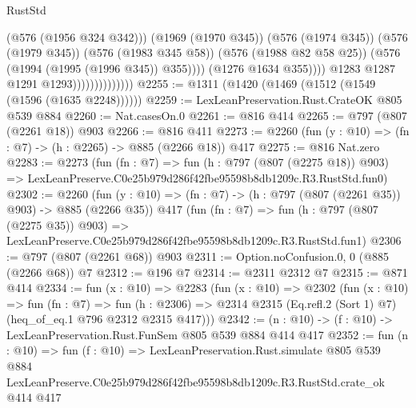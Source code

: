 \begin{lexlean}{RustStd}
\begin{coremodule}
                                            (@576 (@1956 @324 @342)))
                                          (@1969 (@1970 @345))
                                          (@576 (@1974 @345))
                                          (@576 (@1979 @345))
                                          (@576 (@1983 @345 @58))
                                          (@576 (@1988 @82 @58 @25))
                                          (@576 (@1994 (@1995 (@1996 @345)) @355))))
                                      (@1276 @1634 @355))))
                                @1283
                                @1287
                                @1291
                                @1293))))))))))))))
@2255 := @1311 (@1420 (@1469 (@1512 (@1549 (@1596 (@1635 @2248))))))
@2259 := LexLeanPreservation.Rust.CrateOK @805 @539 @884
@2260 := Nat.casesOn.{0}
@2261 := @816 @414
@2265 := @797 (@807 (@2261 @18)) @903
@2266 := @816 @411
@2273 := @2260 (fun (y : @10) => (fn : @7) -> (h : @2265) -> @885 (@2266 @18)) @417
@2275 := @816 Nat.zero
@2283 := @2273
    (fun (fn : @7) =>
    fun (h : @797 (@807 (@2275 @18)) @903) =>
    LexLeanPreserve.C0e25b979d286f42fbe95598b8db1209c.R3.RustStd.fun0)
@2302 := @2260
    (fun (y : @10) => (fn : @7) -> (h : @797 (@807 (@2261 @35)) @903) -> @885 (@2266 @35))
    @417
    (fun (fn : @7) =>
    fun (h : @797 (@807 (@2275 @35)) @903) =>
    LexLeanPreserve.C0e25b979d286f42fbe95598b8db1209c.R3.RustStd.fun1)
@2306 := @797 (@807 (@2261 @68)) @903
@2311 := Option.noConfusion.{0, 0} (@885 (@2266 @68)) @7
@2312 := @196 @7
@2314 := @2311 @2312 @7
@2315 := @871 @414
@2334 := fun (x : @10) =>
  @2283
    (fun (x : @10) =>
    @2302
      (fun (x : @10) =>
      fun (fn : @7) =>
      fun (h : @2306) =>
      @2314 @2315 (Eq.refl.{2} (Sort 1) @7) (heq_of_eq.{1} @796 @2312 @2315 @417)))
@2342 := (n : @10) -> (f : @10) -> LexLeanPreservation.Rust.FunSem @805 @539 @884 @414 @417
@2352 := fun (n : @10) =>
  fun (f : @10) =>
  LexLeanPreservation.Rust.simulate
    @805
    @539
    @884
    LexLeanPreserve.C0e25b979d286f42fbe95598b8db1209c.R3.RustStd.crate_ok
    @414
    @417
\end{coremodule}
\end{lexlean}
